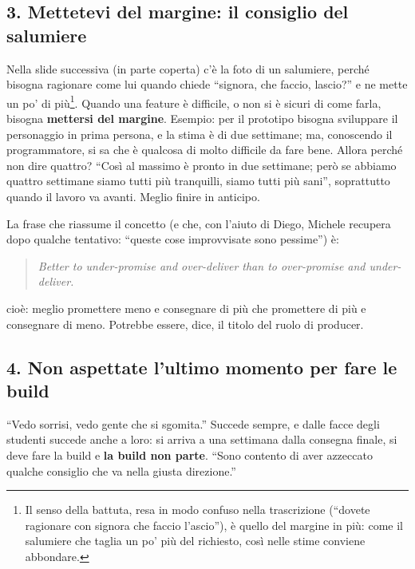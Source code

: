 \subsection{3. Mettetevi del margine: il consiglio del salumiere}

Nella slide successiva (in parte coperta) c'è la foto di un salumiere, perché
bisogna ragionare come lui quando chiede ``signora, che faccio, lascio?'' e ne
mette un po' di più\footnote{Il senso della battuta, resa in modo confuso nella
trascrizione (``dovete ragionare con signora che faccio l'ascio''), è quello
del margine in più: come il salumiere che taglia un po' più del richiesto, così
nelle stime conviene abbondare.}. Quando una feature è difficile, o non si è
sicuri di come farla, bisogna \textbf{mettersi del margine}. Esempio: per il
prototipo bisogna sviluppare il personaggio in prima persona, e la stima è di
due settimane; ma, conoscendo il programmatore, si sa che è qualcosa di molto
difficile da fare bene. Allora perché non dire quattro? ``Così al massimo è
pronto in due settimane; però se abbiamo quattro settimane siamo tutti più
tranquilli, siamo tutti più sani'', soprattutto quando il lavoro va avanti.
Meglio finire in anticipo.

La frase che riassume il concetto (e che, con l'aiuto di Diego, Michele
recupera dopo qualche tentativo: ``queste cose improvvisate sono pessime'') è:
\begin{quote}
  \emph{Better to under-promise and over-deliver than to over-promise and
  under-deliver.}
\end{quote}
cioè: meglio promettere meno e consegnare di più che promettere di più e
consegnare di meno. Potrebbe essere, dice, il titolo del ruolo di producer.

\subsection{4. Non aspettate l'ultimo momento per fare le build}

``Vedo sorrisi, vedo gente che si sgomita.'' Succede sempre, e dalle facce degli
studenti succede anche a loro: si arriva a una settimana dalla consegna finale,
si deve fare la build e \textbf{la build non parte}. ``Sono contento di aver
azzeccato qualche consiglio che va nella giusta direzione.''

